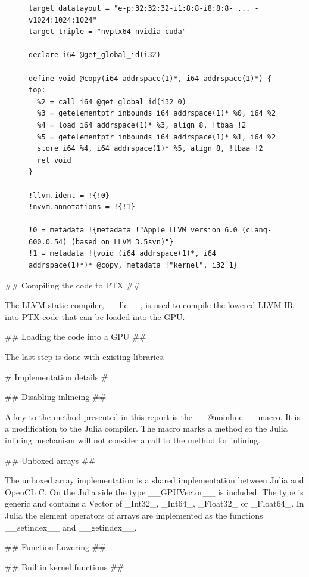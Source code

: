 \begin{markdown}
\begin{figure}[H]
  \begin{verbatim}
target datalayout = "e-p:32:32:32-i1:8:8-i8:8:8- ... -v1024:1024:1024"
target triple = "nvptx64-nvidia-cuda"

declare i64 @get_global_id(i32)

define void @copy(i64 addrspace(1)*, i64 addrspace(1)*) {
top:
  %2 = call i64 @get_global_id(i32 0)
  %3 = getelementptr inbounds i64 addrspace(1)* %0, i64 %2
  %4 = load i64 addrspace(1)* %3, align 8, !tbaa !2
  %5 = getelementptr inbounds i64 addrspace(1)* %1, i64 %2
  store i64 %4, i64 addrspace(1)* %5, align 8, !tbaa !2
  ret void
}

!llvm.ident = !{!0}
!nvvm.annotations = !{!1}

!0 = metadata !{metadata !"Apple LLVM version 6.0 (clang-600.0.54) (based on LLVM 3.5svn)"}
!1 = metadata !{void (i64 addrspace(1)*, i64 addrspace(1)*)* @copy, metadata !"kernel", i32 1}
  \end{verbatim}
  \caption{}
  \label{fig:julia-copy}
\end{figure}

## Compiling the code to PTX ##

The LLVM static compiler, __llc__, is used to compile the lowered LLVM
IR into PTX code that can be loaded into the GPU. 

## Loading the code into a GPU ##

The last step is done with existing libraries. 

# Implementation details #
\label{sec:implementation-details}

## Disabling inlineing ##

A key to the method presented in this report is the __@noinline__
macro. It is a modification to the Julia compiler. The macro marks a
method so the Julia inlining mechanism will not consider a call to the
method for inlining. 

## Unboxed arrays ##
\label{sec:implementation-details-unboxed}

The unboxed array implementation is a shared implementation between
Julia and OpenCL C. On the Julia side the type __GPUVector__ is
included. The type is generic and contains a Vector of _Int32_,
_Int64_, _Float32_ or _Float64_. In Julia the element operators of
arrays are implemented as the functions __setindex__ and __getindex__.

## Function Lowering ##


## Builtin kernel functions ##


\end{markdown}
